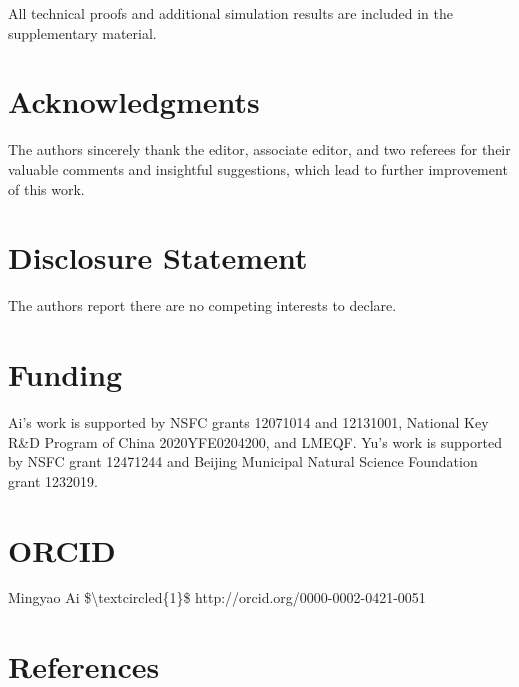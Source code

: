 \documentclass[
  10
]{article}
\begin{document}
All technical proofs and additional simulation results are included in
the supplementary material.

\section{Acknowledgments}\label{acknowledgments}

The authors sincerely thank the editor, associate editor, and two
referees for their valuable comments and insightful suggestions, which
lead to further improvement of this work.

\section{Disclosure Statement}\label{disclosure-statement}

The authors report there are no competing interests to declare.

\section{Funding}\label{funding}

Ai's work is supported by NSFC grants 12071014 and 12131001, National
Key R\&D Program of China 2020YFE0204200, and LMEQF. Yu's work is
supported by NSFC grant 12471244 and Beijing Municipal Natural Science
Foundation grant 1232019.

\section{ORCID}\label{orcid}

Mingyao Ai {\$\textbackslash textcircled\{1\}\$}
http://orcid.org/0000-0002-0421-0051

\section{References}\label{references}
\end{document}
